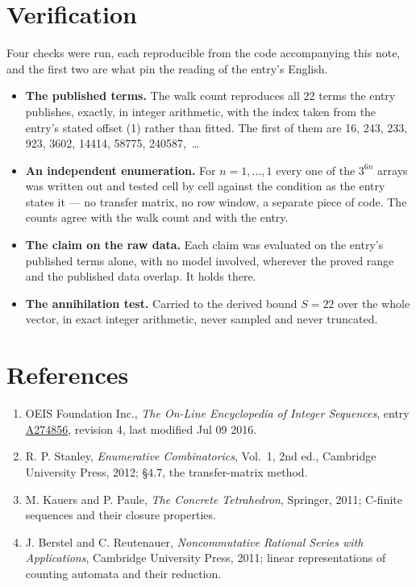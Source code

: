 \documentclass[11pt]{article}
\theoremstyle{definition}
\begin{document}
\section{Verification}

Four checks were run, each reproducible from the code accompanying this note, and the first two are what pin the reading of the entry's English.

\begin{itemize}

\item {\bfseries The published terms.} The walk count reproduces all 22 terms the entry publishes, exactly, in integer arithmetic, with the index taken from the entry's stated offset (1) rather than fitted. The first of them are 16, 243, 233, 923, 3602, 14414, 58775, 240587,~\dots

\item {\bfseries An independent enumeration.} For $n = 1,\dots,1$ every one of the $3^{6n}$ arrays was written out and tested cell by cell against the condition as the entry states it --- no transfer matrix, no row window, a separate piece of code. The counts agree with the walk count and with the entry.

\item {\bfseries The claim on the raw data.} Each claim was evaluated on the entry's published terms alone, with no model involved, wherever the proved range and the published data overlap. It holds there.

\item {\bfseries The annihilation test.} Carried to the derived bound $S = 22$ over the whole vector, in exact integer arithmetic, never sampled and never truncated.

\end{itemize}

\section{References}

\begin{enumerate}

\item OEIS Foundation Inc., \emph{The On-Line Encyclopedia of Integer Sequences}, entry \href{https://oeis.org/A274856}{A274856}, revision 4, last modified Jul 09 2016.

\item R. P. Stanley, \emph{Enumerative Combinatorics}, Vol.~1, 2nd ed., Cambridge University Press, 2012; \S4.7, the transfer-matrix method.

\item M. Kauers and P. Paule, \emph{The Concrete Tetrahedron}, Springer, 2011; C-finite sequences and their closure properties.

\item J. Berstel and C. Reutenauer, \emph{Noncommutative Rational Series with Applications}, Cambridge University Press, 2011; linear representations of counting automata and their reduction.

\end{enumerate}
\end{document}
